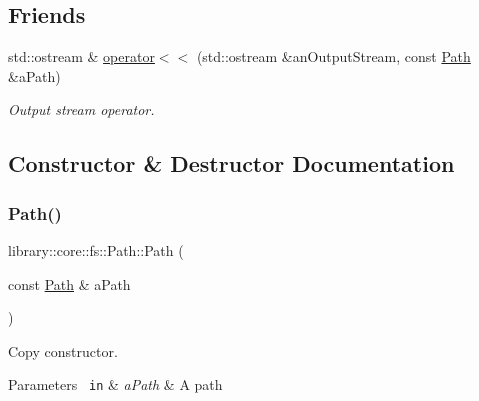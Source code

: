 \subsection*{Friends}
\begin{DoxyCompactItemize}
\item 
std\+::ostream \& \mbox{\hyperlink{classlibrary_1_1core_1_1fs_1_1_path_a87813ac3ede0b43b50ae6b9fdf0a2815}{operator$<$$<$}} (std\+::ostream \&an\+Output\+Stream, const \mbox{\hyperlink{classlibrary_1_1core_1_1fs_1_1_path}{Path}} \&a\+Path)
\begin{DoxyCompactList}\small\item\em Output stream operator. \end{DoxyCompactList}\end{DoxyCompactItemize}


\subsection{Constructor \& Destructor Documentation}
\mbox{\label{classlibrary_1_1core_1_1fs_1_1_path_aabc4240fc08479d1bff6b9753f2b5cc2}} 
\subsubsection{\texorpdfstring{Path()}{Path()}}
{\footnotesize\ttfamily library\+::core\+::fs\+::\+Path\+::\+Path (\begin{DoxyParamCaption}\item[{const \mbox{\hyperlink{classlibrary_1_1core_1_1fs_1_1_path}{Path}} \&}]{a\+Path }\end{DoxyParamCaption})}



Copy constructor. 


\begin{DoxyParams}[1]{Parameters}
\mbox{\texttt{ in}}  & {\em a\+Path} & A path \\
\hline
\end{DoxyParams}
\mbox{\label{classlibrary_1_1core_1_1fs_1_1_path_aa120129d701f0b2366d805f73000cbc6}} 
